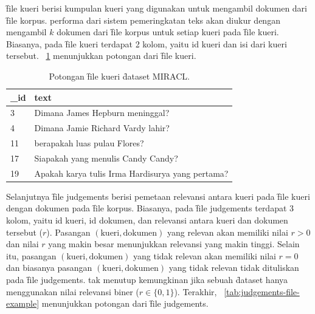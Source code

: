     \f{file} kueri berisi kumpulan kueri yang digunakan untuk mengambil dokumen dari \f{file} korpus. 
    performa dari sistem pemeringkatan teks akan diukur dengan mengambil $k$ dokumen dari \f{file} korpus untuk setiap kueri pada \f{file} kueri. Biasanya, pada \f{file} kueri terdapat 2 kolom, yaitu id kueri dan isi dari kueri tersebut. \tab~\ref{tab:query-file-example} menunjukkan potongan dari \f{file} kueri.
    \begin{table}
        \centering
        \caption{Potongan \f{file} kueri \f{dataset} MIRACL.}
        \label{tab:query-file-example}
        \begin{tabular}{|l|p{}|}
            \hline
            \textbf{\_id} & \textbf{text}                                                                 \\ \hline
            3             & Dimana James Hepburn meninggal?                                              \\ \hline
            4             & Dimana Jamie Richard Vardy lahir?                                            \\ \hline
            11            & berapakah luas pulau Flores?                                                 \\ \hline
            17            & Siapakah yang menulis Candy Candy?                                           \\ \hline
            19            & Apakah karya tulis Irma Hardisurya yang pertama?                              \\ \hline
        \end{tabular}
    \end{table}
    Selanjutnya \f{file judgements} berisi pemetaan relevansi antara kueri pada \f{file} kueri dengan dokumen pada \f{file} korpus. Biasanya, pada \f{file} judgements terdapat 3 kolom, yaitu id kueri, id dokumen, dan relevansi antara kueri dan dokumen tersebut ($r$). Pasangan $(\text{kueri}, \text{dokumen})$ yang relevan akan memiliki nilai $r > 0$ dan nilai $r$ yang makin besar menunjukkan relevansi yang makin tinggi. Selain itu, pasangan $(\text{kueri}, \text{dokumen})$ yang tidak relevan akan memiliki nilai $r = 0$ dan biasanya pasangan $(\text{kueri}, \text{dokumen})$ yang tidak relevan tidak dituliskan pada \f{file judgements}. tak menutup kemungkinan jika sebuah \f{dataset} hanya menggunakan nilai relevansi biner ($r \in \{0, 1\}$). Terakhir, \tab~\ref{tab:judgements-file-example} menunjukkan potongan dari \f{file judgements}.
